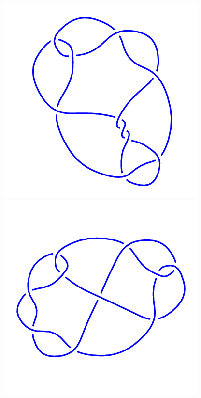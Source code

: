 \begin{figure}[H]
	\begin{minipage}[b]{.18\linewidth}
		\centering
		\includegraphics[width=\linewidth]{../data/10_37.png}
	\end{minipage}
	\begin{minipage}[b]{.18\linewidth}
		\centering
		\includegraphics[width=\linewidth]{../data/10_38.png}

\end{minipage}
\end{figure}
